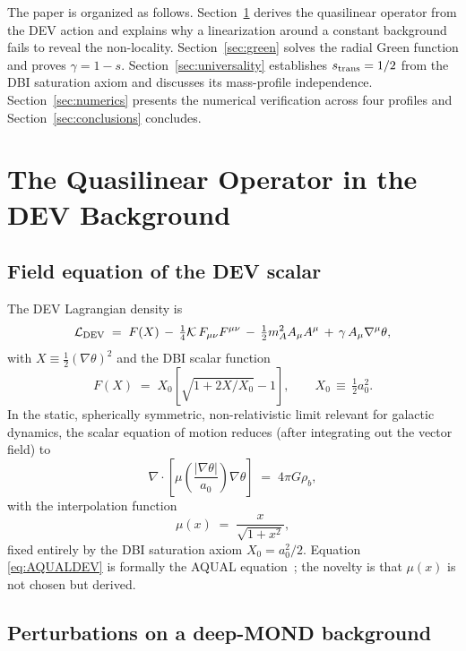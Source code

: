 \documentclass[aps,prd,twocolumn,superscriptaddress,nofootinbib]{revtex4-2}
\begin{document}
The paper is organized as follows. Section~\ref{sec:operator}
derives the quasilinear operator from the DEV action and explains
why a linearization around a constant background fails to reveal
the non-locality. Section~\ref{sec:green} solves the radial Green
function and proves $\gamma = 1-s$. Section~\ref{sec:universality}
establishes $s_{\rm trans} = 1/2$ from the DBI saturation axiom and
discusses its mass-profile independence. Section~\ref{sec:numerics}
presents the numerical verification across four profiles and
Section~\ref{sec:conclusions} concludes.

\section{The Quasilinear Operator in the DEV Background}\label{sec:operator}

\subsection{Field equation of the DEV scalar}

The DEV Lagrangian density is~\cite{PaperI}
\begin{equation}
\mathcal{L}_{\rm DEV} \;=\; F(X) \,-\, \tfrac{1}{4}\mathcal{K}\,
F_{\mu\nu}F^{\mu\nu} \,-\, \tfrac{1}{2}m_A^2 A_\mu A^\mu \,+\,
\gamma\,A_\mu\nabla^\mu\theta,
\label{eq:LDEV}
\end{equation}
with $X \equiv \tfrac{1}{2}(\nabla\theta)^2$ and the DBI scalar
function
\begin{equation}
F(X) \;=\; X_0\!\left[\sqrt{1 + 2X/X_0} - 1\right], \qquad
X_0 \,\equiv\, \tfrac{1}{2}a_0^2.
\label{eq:Fdbi}
\end{equation}
In the static, spherically symmetric, non-relativistic limit
relevant for galactic dynamics, the scalar equation of motion
reduces (after integrating out the vector field) to
\begin{equation}
\nabla\!\cdot\!\left[\mu\!\left(\frac{|\nabla\theta|}{a_0}\right)
\nabla\theta\right] \;=\; 4\pi G\rho_b,
\label{eq:AQUALDEV}
\end{equation}
with the interpolation function
\begin{equation}
\mu(x) \;=\; \frac{x}{\sqrt{1+x^2}},
\label{eq:mu}
\end{equation}
fixed entirely by the DBI saturation axiom $X_0=a_0^2/2$. Equation
\eqref{eq:AQUALDEV} is formally the AQUAL equation~\cite{BM1984};
the novelty is that $\mu(x)$ is not chosen but derived.

\subsection{Perturbations on a deep-MOND background}
\end{document}

